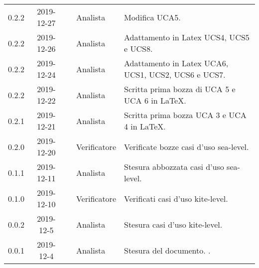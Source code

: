 {\begin{longtable}{ c c  C{4cm}  C{3cm} C{4cm}}
0.2.2 & 2019-12-27 & \PF{} & Analista & Modifica UCA5. \\

0.2.2 & 2019-12-26 & \CE{} & Analista & Adattamento in Latex UCS4, UCS5 e UCS8. \\

0.2.2 & 2019-12-24 & \DF{} & Analista & Adattamento in Latex UCA6, UCS1, UCS2, UCS6 e UCS7. \\

0.2.2 & 2019-12-22 & \PF{} & Analista & Scritta prima bozza di UCA 5 e UCA 6 in LaTeX. \\

0.2.1 & 2019-12-21 & \PF{} & Analista & Scritta prima bozza UCA 3 e UCA 4 in LaTeX. \\

0.2.0 & 2019-12-20 & \SE{} & Verificatore & Verificate bozze casi d'uso sea-level. \\

0.1.1 & 2019-12-11 & \DF{} & Analista & Stesura abbozzata casi d'uso sea-level. \\

0.1.0 & 2019-12-10 & \BR{} & Verificatore & Verificati casi d'uso kite-level. \\

0.0.2 & 2019-12-5 & \CE{} & Analista & Stesura casi d'uso kite-level. \\

0.0.1 & 2019-12-4 & \CE{} & Analista & Stesura del documento. . \\		
		
\end{longtable}
}